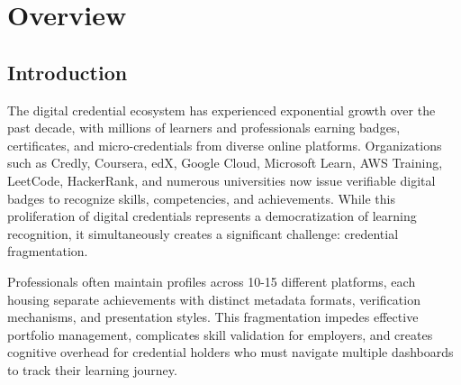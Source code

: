\documentclass[12pt,a4paper]{article}
\begin{document}
\newpage
\thispagestyle{plain}
\begin{abstract}
\justify
Professionals and learners accumulate digital badges across multiple platforms (Credly, Google Cloud, LeetCode, Microsoft Learn, AWS), creating significant portfolio management challenges. \textbf{Orbito} is a full stack web application that aggregates and visualizes digital badges from diverse credentialing platforms into a unified interface. Built using React Express.js, and MongoDB, the platform implements OAuth2.0 authentication, JWT-based security, and RESTful API design. The system achieved 96.9\% API integration success rate with real credentialing platforms, demonstrating the technical feasibility of unified credential management. This report presents the system architecture, implementation methodology, experimental validation, and results that validate Orbito as a practical solution to credential fragmentation.

\vspace{0.2cm}
\textbf{Keywords:} Digital Badges, Credential Aggregation, REST API, OAuth 2.0, Full-Stack Development, React, Express.js, MongoDB
\end{abstract}

\newpage
\tableofcontents
\newpage
\listoffigures
\newpage
\listoftables
\newpage

\section{Overview}
\justify

\subsection{Introduction}
The digital credential ecosystem has experienced exponential growth over the past decade, with millions of learners and professionals earning badges, certificates, and micro-credentials from diverse online platforms. Organizations such as Credly, Coursera, edX, Google Cloud, Microsoft Learn, AWS Training, LeetCode, HackerRank, and numerous universities now issue verifiable digital badges to recognize skills, competencies, and achievements. While this proliferation of digital credentials represents a democratization of learning recognition, it simultaneously creates a significant challenge: credential fragmentation.

\vspace{0.2cm}
\noindent
Professionals often maintain profiles across 10-15 different platforms, each housing separate achievements with distinct metadata formats, verification mechanisms, and presentation styles. This fragmentation impedes effective portfolio management, complicates skill validation for employers, and creates cognitive overhead for credential holders who must navigate multiple dashboards to track their learning journey.
\end{document}
